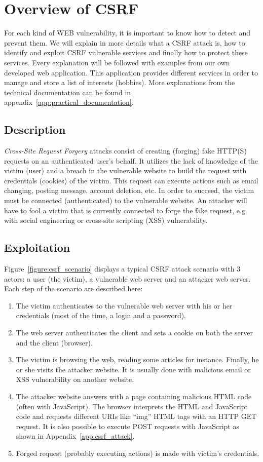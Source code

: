 \documentclass[a4paper,11pt,openany]{report}
\newcommand{\csrf}{\textit{Cross-Site Request Forgery}}
\begin{document}
  \section{Overview of CSRF}
  For each kind of WEB vulnerability, it is important to know how to detect and prevent them. 
  We will explain in more details what a CSRF attack is, how to identify and exploit CSRF 
  vulnerable services and finally how to protect these services. 
  Every explanation will be followed with examples from our own developed web application. 
  This application provides different services in order to manage and store a list of 
  interests (hobbies). More explanations from the technical documentation can be found 
  in appendix~\ref{app:practical_documentation}.
  
  \subsection{Description}
  \csrf{} attacks consist of creating (forging) fake HTTP(S) requests on an authenticated 
  user's behalf. It utilizes the lack of knowledge of the victim (user) and a breach in 
  the vulnerable website to build the request with credentials (cookies) of the victim. This 
  request can execute actions such as email changing, posting message, account deletion, etc.
  In order to succeed, the victim must be connected (authenticated) to the vulnerable website. 
  An attacker will have to fool a victim that is currently connected to forge the fake request, 
  e.g. with social engineering or cross-site scripting (XSS)\cite{wikipedia_xss} vulnerability.
  
  \subsection{Exploitation}
  Figure~\ref{figure:csrf_scenario} displays a typical CSRF attack scenario with 3 actors: a 
  user (the victim), a vulnerable web server and an attacker web server. Each step of the 
  scenario are described here:
  \begin{enumerate}
   \item The victim authenticates to the vulnerable web server with his or her credentials (most 
   of the time, a login and a password).
   \item The web server authenticates the client and sets a cookie on both the server and the client (browser).
   \item The victim is browsing the web, reading some articles for instance. Finally, he or 
   she visits the attacker website. It is usually done with malicious email or XSS vulnerability 
   on another website.
   \item The attacker website answers with a page containing malicious HTML code (often with 
   JavaScript). The browser interprets the HTML and JavaScript code and requests different URIs like 
   ``img'' HTML tags with an HTTP GET request. It is also possible to execute POST requests with 
   JavaScript as shown in Appendix~\ref{app:csrf_attack}.
   \item Forged request (probably executing actions) is made with victim's credentials.
  \end{enumerate}
  
\end{document}
